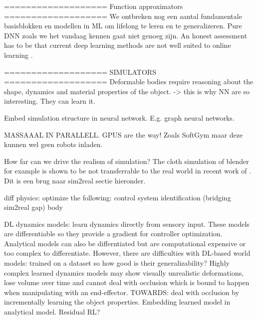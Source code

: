 \documentclass[\home/main.tex]{subfiles}
\begin{document}
===================
Function approximators 
===================
We ontbreken nog een aantal fundamentale basisblokken en modellen in ML om lifelong te leren en te generalizeren. Pure DNN zoals we het vandaag kennen gaat niet genoeg zijn.  
An honest assessment has to be that current deep learning methods are not well suited to online learning \autocite{Sutton2018}. %

===================
SIMULATORS 
===================
Deformable bodies require reasoning about the shape, dynamics and material properties of the object. -> this is why NN are so interesting. They can learn it.

Embed simulation structure in neural network. E.g. graph neural networks.  

MASSAAAL IN PARALLELL. GPUS are the way! Zoals SoftGym maar deze kunnen wel geen robots inladen. 


How far can we drive the realism of simulation? The cloth simulation of blender for example is shown to be not transferrable to the real world in recent work of \autocite{Tanaka2018}. Dit is een brug naar sim2real sectie hieronder.

diff physics:
    optimize the following:
        control
        system identification  (bridging sim2real gap)
        body 


        DL dynamics models: learn dynamics directly from sensory input. These models are differentiable so they provide a gradient for controller optimization. Analytical models can also be differntiated but are computational expensive or too complex to differentiate. However, there are difficulties with DL-based world models: trained on a dataset so how good is their generalizability? Highly complex learned dynamics models \autocite{Mrowca2018, Li2018} may show visually unrealistic deformations, lose volume over time and cannot deal with occlusion which is bound to happen when manipulating with an end-effector. TOWARDS: deal with occlusion by incrementally learning the object properties. Embedding learned model in analytical model. Residual RL? 
\end{document}
